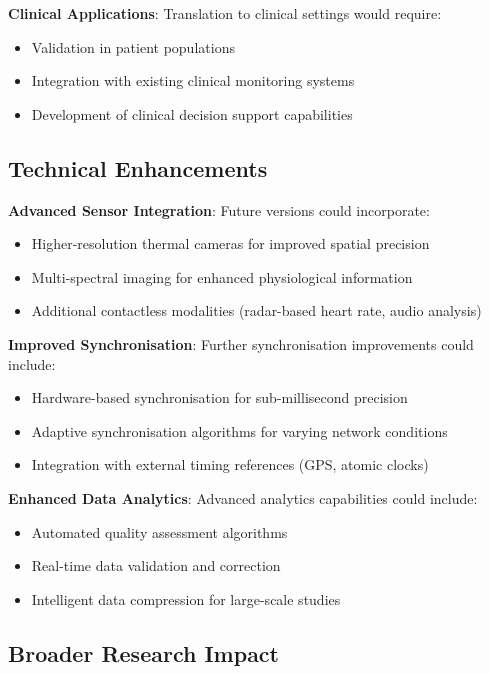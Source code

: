 \textbf{Clinical Applications}: Translation to clinical settings would require:

\begin{itemize}
\item Validation in patient populations
\item Integration with existing clinical monitoring systems
\item Development of clinical decision support capabilities
\end{itemize}

\subsection{Technical Enhancements}

\textbf{Advanced Sensor Integration}: Future versions could incorporate:

\begin{itemize}
\item Higher-resolution thermal cameras for improved spatial precision
\item Multi-spectral imaging for enhanced physiological information
\item Additional contactless modalities (radar-based heart rate, audio analysis)
\end{itemize}

\textbf{Improved Synchronisation}: Further synchronisation improvements could include:

\begin{itemize}
\item Hardware-based synchronisation for sub-millisecond precision
\item Adaptive synchronisation algorithms for varying network conditions
\item Integration with external timing references (GPS, atomic clocks)
\end{itemize}

\textbf{Enhanced Data Analytics}: Advanced analytics capabilities could include:

\begin{itemize}
\item Automated quality assessment algorithms
\item Real-time data validation and correction
\item Intelligent data compression for large-scale studies
\end{itemize}

\subsection{Broader Research Impact}

